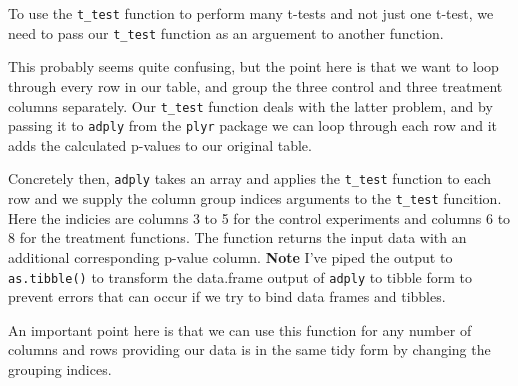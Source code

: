 \documentclass[12pt,]{book}
\newenvironment{Shaded}{\begin{snugshade}}{\end{snugshade}}
\newcommand{\CommentTok}[1]{\textcolor[rgb]{0.56,0.35,0.01}{\textit{#1}}}
\newcommand{\ControlFlowTok}[1]{\textcolor[rgb]{0.13,0.29,0.53}{\textbf{#1}}}
\newcommand{\DataTypeTok}[1]{\textcolor[rgb]{0.13,0.29,0.53}{#1}}
\newcommand{\KeywordTok}[1]{\textcolor[rgb]{0.13,0.29,0.53}{\textbf{#1}}}
\newcommand{\NormalTok}[1]{#1}
\newcommand{\OperatorTok}[1]{\textcolor[rgb]{0.81,0.36,0.00}{\textbf{#1}}}
\newcommand{\StringTok}[1]{\textcolor[rgb]{0.31,0.60,0.02}{#1}}
\begin{document}
\begin{Shaded}
\end{Shaded}

To use the \texttt{t\_test} function to perform many t-tests and not just one t-test, we
need to pass our \texttt{t\_test} function as an arguement to another function.

This probably seems quite confusing, but the point here is that we want to loop
through every row in our table, and group the three control and three treatment
columns separately. Our \texttt{t\_test} function deals with the latter problem, and
by passing it to \texttt{adply} from the \texttt{plyr} package we can loop through each row
and it adds the calculated p-values to our original table.

Concretely then, \texttt{adply} takes an array and applies the \texttt{t\_test} function to
each row and we supply the column group indices arguments to the \texttt{t\_test}
funcition. Here the indicies are columns 3 to 5 for the control experiments and
columns 6 to 8 for the treatment functions. The function returns the input
data with an additional corresponding p-value column. \textbf{Note} I've piped
the output to \texttt{as.tibble()} to transform the data.frame output of \texttt{adply} to
tibble form to prevent errors that can occur if we try to bind data frames
and tibbles.

An important point here is that we can use this function for any number of
columns and rows providing our data is in the same tidy form by changing the
grouping indices.
\end{document}
